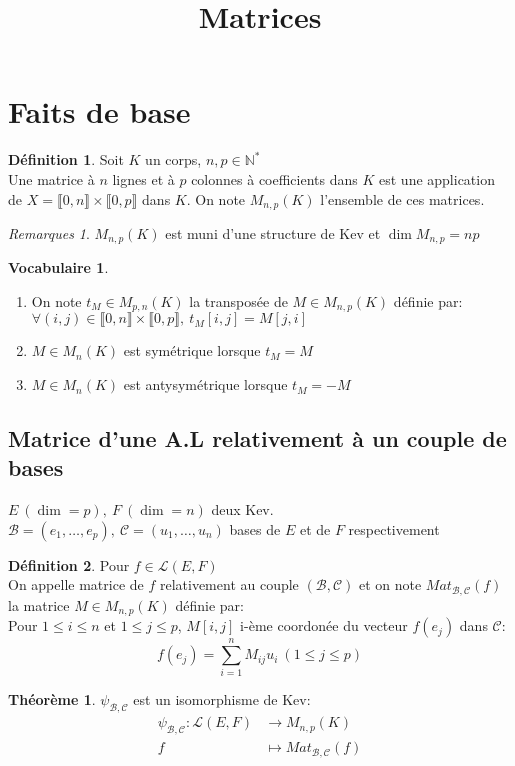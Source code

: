 \documentclass[fleqn]{article}
\title{Matrices}
\date{}
\theoremstyle{definition} \newtheorem*{defi}{D\'efinition}
\theoremstyle{definition} \newtheorem*{theo}{Th\'eor\`eme}
\theoremstyle{definition} \newtheorem*{coro}{Corollaire}
\theoremstyle{definition} \newtheorem*{nota}{Notation}
\theoremstyle{definition} \newtheorem*{vocab}{Vocabulaire}
\theoremstyle{remark} \newtheorem*{rqs}{Remarques}
\theoremstyle{definition} \newtheorem*{prop}{Propri\'et\'e}
\begin{document}
\maketitle

\section{Faits de base}
\begin{defi} Soit $K$ un corps, $n,p \in \mathbb{N}^*$\\
	Une matrice \`a $n$ lignes et \`a $p$ colonnes \`a coefficients dans $K$ est une application de $X = \llbracket 0,n \rrbracket \times
	\llbracket 0,p \rrbracket $ dans $K$. On note $M_{n,p}(K)$ l'ensemble de ces matrices.

	\begin{rqs} $M_{n,p}(K)$ est muni d'une structure de Kev et $\dim M_{n,p} = np$
	\end{rqs}
\end{defi}

\begin{vocab} $ $
	\begin{enumerate}
		\item On note $t_M \in M_{p,n}(K)$ la transpos\'ee de $M \in M_{n,p}(K)$ d\'efinie par: $\forall (i,j) \in
			\llbracket 0,n \rrbracket \times \llbracket 0,p \rrbracket ,\ t_M[i,j] = M[j,i]$
		\item $M \in M_n(K)$ est sym\'etrique lorsque $t_M = M$
		\item $M \in M_n(K)$ est antysym\'etrique lorsque $t_M = -M$
	\end{enumerate}
\end{vocab}

\subsection{Matrice d'une A.L relativement à un couple de bases}
$E\ (\dim = p),\ F\ (\dim = n)$ deux Kev.\\ $\mathscr{B} = (e_1, \hdots, e_p),\ \mathscr{C} = (u_1, \hdots, u_n)$ bases de $E$ et
de $F$ respectivement
\begin{defi} Pour $f \in \mathscr{L}(E,F)$\\
	On appelle matrice de $f$ relativement au couple $(\mathscr{B},\mathscr{C})$ et on note $Mat_{\mathscr{B},\mathscr{C}}(f)$ la matrice
	$M \in M_{n,p}(K)$ d\'efinie par:\\ Pour $1 \leq i \leq n$ et $1 \leq j \leq p$, $M[i,j]$ i-\`eme coordon\'ee du vecteur $f(e_j)$ dans
	$\mathscr{C}$: \\
	\[f(e_j) = \sum_{i=1}^n M_{ij} u_i\ (1\leq j \leq p)\]

\begin{theo} $\psi_{\mathscr{B},\mathscr{C}}$ est un isomorphisme de Kev:
	\begin{align*}
		\psi_{\mathscr{B},\mathscr{C}}: \mathscr{L}(E,F) &\rightarrow M_{n,p}(K)\\
		f & \mapsto Mat_{\mathscr{B},\mathscr{C}}(f)
	\end{align*}
\end{theo}
\end{defi}
\end{document}
